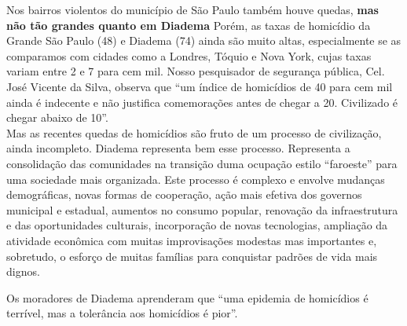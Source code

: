 \documentclass[
	12pt,				%
	openright,			%
	twoside,			%
	a4paper,			%
	chapter=TITLE,		%
	section=TITLE,		%
	subsection=TITLE,	%
	subsubsection=TITLE,%
	spanish,            %
	english,			%
	brazil				%
	]{abntex2}
\begin{document}
\begin{citacao}
	Nos bairros violentos do município de São Paulo	também houve quedas, \textbf{mas não tão grandes quanto em Diadema}
	Porém, as taxas de homicídio da Grande São Paulo (48) e Diadema (74) ainda são muito altas,
	especialmente se as comparamos com cidades como a Londres, Tóquio e Nova York, cujas taxas variam entre
	2 e 7 para cem mil. Nosso pesquisador de segurança pública, Cel. José Vicente da Silva, observa que “um
	índice de homicídios de 40 para cem mil ainda é indecente e não justifica comemorações antes de chegar
	a 20. Civilizado é chegar abaixo de 10”.\\
	Mas as recentes quedas de homicídios são fruto de um processo de civilização, ainda incompleto.
	Diadema representa bem esse processo. Representa a consolidação das comunidades na transição duma
	ocupação estilo “faroeste” para uma sociedade mais organizada. Este processo é complexo e envolve
	mudanças demográficas, novas formas de cooperação, 	ação mais efetiva dos governos municipal e estadual,
	aumentos no consumo popular, renovação da infraestrutura e das oportunidades culturais, incorporação
	de novas tecnologias, ampliação da atividade econômica com muitas improvisações modestas mas importantes e,
	sobretudo, o esforço de muitas famílias para conquistar	padrões de vida mais dignos.\cite[p. ~4, grifo do autor]{Braudel}
\end{citacao}
\par
Os moradores de Diadema aprenderam que “uma epidemia de homicídios é terrível, mas a tolerância aos homicídios é pior”\cite[p. ~5]{Braudel}.
\end{document}
